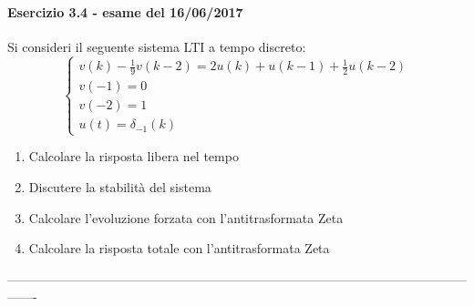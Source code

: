 \documentclass[12pt,a4paper]{article}
\begin{document}
		\paragraph*{Esercizio 3.4 - esame del 16/06/2017} Si consideri il seguente sistema LTI a tempo discreto:
		\[
			\begin{cases}
			v(k) - \frac{1}{9}v(k-2) = 2u(k) + u(k-1) + \frac{1}{2}u(k-2)\\
			v(-1) = 0\\
			v(-2) = 1\\
			u(t) = \delta_{-1}(k)
			\end{cases}
		\]
		\begin{enumerate}
			\item Calcolare la risposta libera nel tempo
			\item Discutere la stabilit\`a del sistema
			\item Calcolare l'evoluzione forzata con l'antitrasformata Zeta
			\item Calcolare la risposta totale con l'antitrasformata Zeta
		\end{enumerate}
		-------------------------------------------------------------------------------------------------------------------\\
\end{document}

